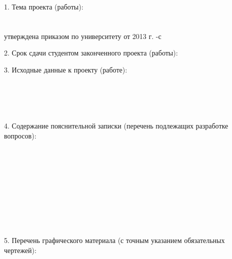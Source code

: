 {\begin{center}
  \end{center}

  1. Тема проекта (работы):
  \lineunderscore\\
  \lineunderscore\\
  \lineunderscore\\
  утверждена приказом по университету от \uline{\hspace*{1.5em}} \uline{\hspace*{5em}} 2013 г.  \No{} \uline{\hspace*{2em}}-с

  \vspace{1em}

  2. Срок сдачи студентом законченного проекта (работы): \lineunderscore

  \vspace{1em}

  3. Исходные данные к проекту (работе):
  \lineunderscore\\
  \lineunderscore\\
  \lineunderscore\\
  \lineunderscore\\
  \lineunderscore\\
  \lineunderscore

  \vspace{1em}

  4. Содержание пояснительной записки (перечень подлежащих разработке вопросов):
  \lineunderscore\\
  \lineunderscore\\
  \lineunderscore\\
  \lineunderscore\\
  \lineunderscore\\
  \lineunderscore\\
  \lineunderscore\\
  \lineunderscore\\
  \lineunderscore\\
  \lineunderscore\\
  \lineunderscore

  \clearpage
  \thispagestyle{empty}

  5. Перечень графического материала (с точным указанием обязательных чертежей):
  \lineunderscore\\
  \lineunderscore\\
  \lineunderscore\\
  \lineunderscore\\
  \lineunderscore\\
  \lineunderscore\\
  \lineunderscore\\
  \lineunderscore

}
